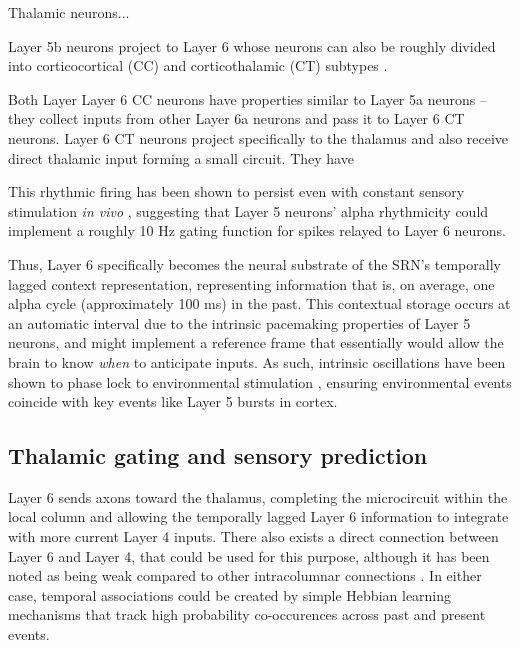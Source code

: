 \documentclass[dwyatte_dissertation.tex]{subfiles}
\begin{document}
Thalamic neurons...


Layer 5b neurons project to Layer 6 whose neurons can also be roughly divided into corticocortical (CC) and corticothalamic (CT) subtypes \cite{Thomson10}.

Both Layer Layer 6 CC neurons have properties similar to Layer 5a neurons -- they collect inputs from other Layer 6a neurons and pass it to Layer 6 CT neurons. Layer 6 CT neurons project specifically to the thalamus and also receive direct thalamic input forming a small circuit. They have 

This rhythmic firing has been shown to persist even with constant sensory stimulation \textit{in vivo} \cite{LuczakBarthoHarris13}, suggesting that Layer 5 neurons' alpha rhythmicity could implement a roughly 10 Hz gating function for spikes relayed to Layer 6 neurons. %

Thus, Layer 6 specifically becomes the neural substrate of the SRN's temporally lagged context representation, representing information that is, on average, one alpha cycle (approximately 100 ms) in the past. This contextual storage occurs at an automatic interval due to the intrinsic pacemaking properties of Layer 5 neurons, and might implement a reference frame that essentially would allow the brain to know \textit{when} to anticipate inputs. As such, intrinsic oscillations have been shown to phase lock to environmental stimulation \cite{WillBerg07,LakatosKarmosMehtaEtAl08,SchroederLakatos09,StefanicsHangyaHernadiEtAl10}, ensuring environmental events coincide with key events like Layer 5 bursts in cortex. %

\subsection{Thalamic gating and sensory prediction}

Layer 6 sends axons toward the thalamus, completing the microcircuit within the local column and allowing the temporally lagged Layer 6 information to integrate with more current Layer 4 inputs. There also exists a direct connection between Layer 6 and Layer 4, that could be used for this purpose, although it has been noted as being weak compared to other intracolumnar connections \cite{HirschMartinez06b}. In either case, temporal associations could be created by simple Hebbian learning mechanisms that track high probability co-occurences across past and present events. %
\end{document}
